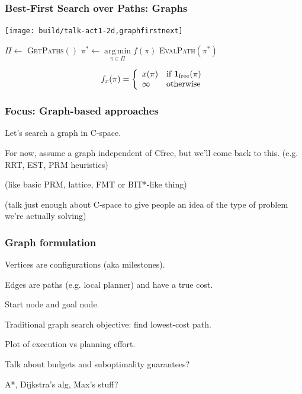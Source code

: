 \documentclass[serif]{beamer}
\DeclareMathOperator*{\argmin}{arg\,min}
\begin{document}
\begin{frame}
   \frametitle{Best-First Search over Paths: Graphs}
   \begin{center}
      \texttt{[image: build/talk-act1-2d,graphfirstnext]}
      
      \begin{minipage}{0.65\textwidth}
      \begin{algorithmic}
      \Loop
         \State $\Pi \leftarrow $ \textsc{GetPaths}$()$
            \Comment {}
         \State $\pi^* \leftarrow \argmin\limits_{\pi \in \Pi} f(\pi)$
            \Comment {}
         \State \textsc{EvalPath}$(\pi^*)$
            \Comment {}
      \EndLoop
      \end{algorithmic}
      \end{minipage}
      
      \begin{equation*}
         f_x(\pi) =
         \left\{ \begin{array}{ll}
             x(\pi) & \mbox{if } {\bf 1}_{\mbox{\scriptsize free}}(\pi) \\
             \infty & \mbox{otherwise}
         \end{array} \right.
      \end{equation*}
      
   \end{center}
\end{frame}

\begin{frame}
   \frametitle{Focus: Graph-based approaches}
   
   Let's search a graph in C-space.
   
   For now, assume a graph independent of Cfree,
   but we'll come back to this. (e.g. RRT, EST, PRM heuristics)
   
   (like basic PRM, lattice, FMT or BIT*-like thing)
   
   (talk just enough about C-space to give people an idea
   of the type of problem we're actually solving)
   
\end{frame}

\begin{frame}
   \frametitle{Graph formulation}
   
   Vertices are configurations (aka milestones).
   
   Edges are paths (e.g. local planner) and have a true cost.
   
   Start node and goal node.
   
   Traditional graph search objective: find lowest-cost path.
   
   Plot of execution vs planning effort.
   
   Talk about budgets and suboptimality guarantees?
   
   A*, Dijkstra's alg, Max's stuff?

\end{frame}
\end{document}
